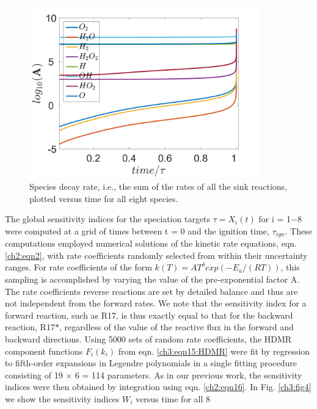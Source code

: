 \begin{figure}[htbp]
	\caption[Species decay rates versus time of H$_2$-O$_2$ combustion system]{Species decay rate, i.e., the sum of the rates of all the sink reactions, plotted versus time for all eight species.}
    \begin{center}
	\includegraphics[width=100mm]{figs/chapter3/fig3.png}
    \end{center}
\label{ch3:fig3}
\end{figure}
The global sensitivity indices for the speciation targets $\tau=X_i(t)$ for i = 1−8 were computed at a grid of times between t =
0 and the ignition time, $\tau_{ign}$. These computations employed
numerical solutions of the kinetic rate equations, eqn. \ref{ch2:eqn2}, with
rate coefficients randomly selected from within their
uncertainty ranges. For rate coefficients of the form $k(T)=AT^{\delta}exp\left( -{E_a}/\left({RT}\right)\right)$, this sampling is accomplished by varying the value of the pre-exponential factor A. The rate coefficients
reverse reactions are set by detailed balance and thus are not
independent from the forward rates. We note that the
sensitivity index for a forward reaction, such as R17, is thus
exactly equal to that for the backward reaction, R17$\ast$, regardless
of the value of the reactive flux in the forward and backward
directions. Using 5000 sets of random rate coefficients, the
HDMR component functions $F_i(k_i)$ from eqn. \ref{ch3:eqn15:HDMR} were fit by
regression to fifth-order expansions in Legendre polynomials in
a single fitting procedure consisting of 19 $\times$ 6 = 114
parameters. As in our previous work, the sensitivity indices
were then obtained by integration using eqn. \ref{ch2:eqn16}.\cite{ch1_IRPC_64_skodje2010theoretical,ch3_42_klippenstein2011uncertainty,ch1_IRPC_65_davis2011global,ch1_IRPC_66_zhou2013multitarget} In Fig. \ref{ch3:fig4} we show the sensitivity indices $W_i$ versus time for all 8
